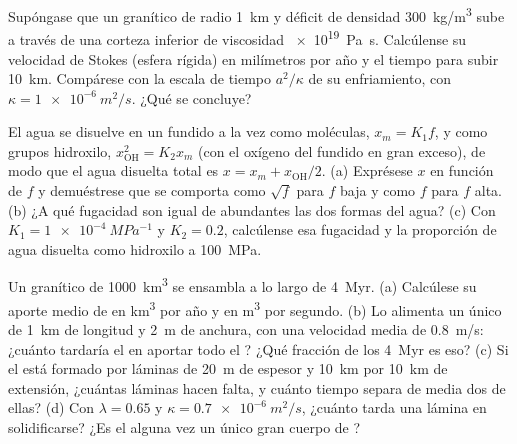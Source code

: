 \begin{exercise}[$\star\star$]\label{exo:b2:magma-emplacement:9}
Supóngase que un  granítico de radio \qty{1}{km} y déficit de densidad
\qty{300}{kg/m^3} sube a través de una corteza inferior de viscosidad \qty{e19}{Pa.s}. Calcúlense
su velocidad de Stokes (esfera rígida) en milímetros por año y el tiempo para subir
\qty{10}{km}. Compárese con la escala de tiempo $a^2/\kappa$ de su enfriamiento, con $\kappa
= \qty{1e-6}{m^2/s}$. ¿Qué se concluye?
\end{exercise}

\begin{exercise}[$\star\star\star$]\label{exo:b2:magma-emplacement:10}
El agua se disuelve en un fundido a la vez como moléculas, $x_m = K_1 f$, y como grupos
hidroxilo, $x_{\mathrm{OH}}^2 = K_2 x_m$ (con el oxígeno del fundido en gran exceso), de modo
que el agua disuelta total es $x = x_m + x_{\mathrm{OH}}/2$. (a) Exprésese $x$ en
función de $f$ y demuéstrese que se comporta como $\sqrt f$ para $f$ baja y como $f$ para
$f$ alta. (b) ¿A qué fugacidad son igual de abundantes las dos formas del agua? (c)
Con $K_1 = \qty{1e-4}{MPa^{-1}}$ y $K_2 = 0.2$, calcúlense esa fugacidad y la
proporción de agua disuelta como hidroxilo a \qty{100}{MPa}.
\end{exercise}

\begin{exercise}[$\star\star\star$]\label{exo:b2:magma-emplacement:11}
Un  granítico de \qty{1000}{km^3} se ensambla a lo largo de \qty{4}{Myr}. (a) Calcúlese
su aporte medio de  en \unit{km^3} por año y en \unit{m^3} por segundo. (b) Lo alimenta
un único  de \qty{1}{km} de longitud y \qty{2}{m} de anchura, con una velocidad media de
\qty{0.8}{m/s}: ¿cuánto tardaría el  en aportar todo el
? ¿Qué fracción de los \qty{4}{Myr} es eso? (c) Si el  está formado por
láminas de \qty{20}{m} de espesor y \qty{10}{km} por \qty{10}{km} de extensión, ¿cuántas láminas
hacen falta, y cuánto tiempo separa de media dos de ellas? (d) Con
$\lambda = 0.65$ y $\kappa = \qty{0.7e-6}{m^2/s}$, ¿cuánto tarda una lámina en
solidificarse? ¿Es el  alguna vez un único gran cuerpo de ?
\end{exercise}

